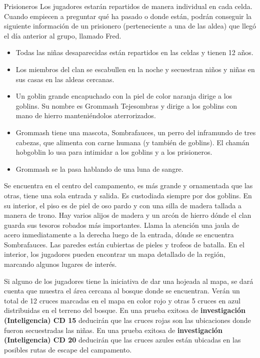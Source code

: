 \documentclass[10pt,twoside,twocolumn,openany]{dndbook}
\begin{document}
\begin{DndComment}{Prisioneros}
Los jugadores estarán repartidos de manera individual en cada celda. Cuando empiecen a preguntar qué 
ha pasado o donde están, podrán conseguir la siguiente información de un prisionero (perteneciente 
a una de las aldea) que llegó el día anterior al grupo, llamado Fred.

  \begin{itemize}
    \item Todas las niñas desaparecidas están repartidos en las celdas y tienen 12 años.
    \item Los miembros del clan se escabullen en la noche y secuestran niños y niñas en sus casas en las aldeas cercanas.
    \item Un goblin grande encapuchado con la piel de color naranja dirige a los goblins. Su nombre es Grommash Tejesombras y dirige a los goblins con mano de hierro manteniéndolos aterrorizados.
    \item Grommash tiene una mascota, Sombrafauces, un perro del inframundo de tres cabezas, que alimenta con carne humana (y también de goblins). El chamán hobgoblin lo usa para intimidar a los goblins y a los prisioneros.
    \item Grommash se la pasa hablando de una luna de sangre.
  \end{itemize}

\end{DndComment}

Se encuentra en el centro del campamento, es más grande y ornamentada que las otras, tiene una sola 
entrada y salida. Es custodiada siempre por dos goblins. En su interior, el piso es de piel de oso pardo 
y con una silla de madera tallada a manera de trono. Hay varios alijos de madera y un arcón de hierro 
dónde el clan guarda sus tesoros robados más importantes. Llama la atención una jaula de acero 
inmediatamente a la derecha luego de la entrada, dónde se encuentra Sombrafauces. Las paredes están 
cubiertas de pieles y trofeos de batalla. En el interior, los jugadores pueden encontrar un mapa 
detallado de la región, marcando algunos lugares de interés.

Si alguno de los jugadores tiene la iniciativa de dar una hojeada al mapa, se dará cuenta que 
muestra el área cercana al bosque donde se encuentran. Verán un total de 12 cruces marcadas en el 
mapa en color rojo y otras 5 cruces en azul distribuidas en el terreno del bosque. En una prueba 
exitosa de \textbf{investigación (Inteligencia) CD 15} deducirán que las cruces rojas son las 
ubicaciones donde fueron secuestradas las niñas. En una prueba exitosa de 
\textbf{investigación (Inteligencia) CD 20} deducirán que las cruces azules están ubicadas en 
las posibles rutas de escape del campamento.
\end{document}
